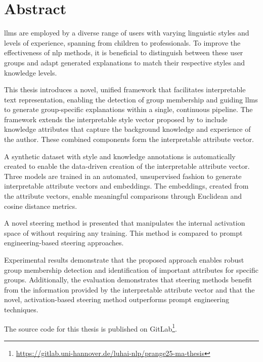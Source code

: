 %
\chapter*{Abstract}%
\label{sec:abstract}
\vspace*{-10mm}

{
  \addtolength{\parskip}{-1pt}
  \Acp{llm} are employed by a diverse range of users with varying linguistic styles and levels of experience, spanning from children to professionals. To improve the effectiveness of \ac{nlp} methods, it is beneficial to distinguish between these user groups and adapt generated explanations to match their respective styles and knowledge levels.

  This thesis introduces a novel, unified framework that facilitates interpretable text representation, enabling the detection of group membership and guiding \acp{llm} to generate group-specific explanations within a single, continuous pipeline. The framework extends the interpretable style vector proposed by \citet{patelLearningInterpretableStyle2023} to include knowledge attributes that capture the background knowledge and experience of the author. These combined components form the interpretable attribute vector.

  A synthetic dataset with style and knowledge annotations is automatically created to enable the data-driven creation of the interpretable attribute vector. Three models are trained in an automated, unsupervised fashion to generate interpretable attribute vectors and embeddings. The embeddings, created from the attribute vectors, enable meaningful comparisons through Euclidean and cosine distance metrics.

  A novel steering method is presented that manipulates the internal activation space of  without requiring any training. This method is compared to prompt engineering-based steering approaches.

  Experimental results demonstrate that the proposed approach enables robust group membership detection and identification of important attributes for specific groups. Additionally, the evaluation demonstrates that steering methods benefit from the information provided by the interpretable attribute vector and that the novel, activation-based steering method outperforms prompt engineering techniques.

  The source code for this thesis is published on GitLab\footnote{\url{https://gitlab.uni-hannover.de/luhai-nlp/prange25-ma-thesis}}.
}


